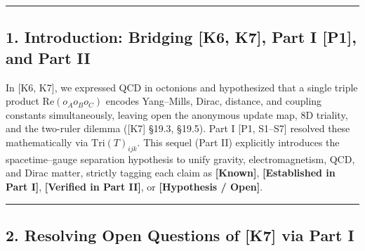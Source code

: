 \documentclass[
  a4paper,
]{article}
\begin{document}
\begin{center}\rule{0.5\linewidth}{0.5pt}\end{center}

\subsection{1. Introduction: Bridging {[}K6, K7{]}, Part I {[}P1{]}, and
Part II}\label{introduction-bridging-k6-k7-part-i-p1-and-part-ii}

In {[}K6, K7{]}, we expressed QCD in octonions and hypothesized that a
single triple product \(\mathrm{Re}(o_A o_B o_C)\) encodes Yang--Mills,
Dirac, distance, and coupling constants simultaneously, leaving open the
anonymous update map, 8D triality, and the two-ruler dilemma ({[}K7{]}
§19.3, §19.5). Part I {[}P1, S1--S7{]} resolved these mathematically via
\(\mathrm{Tri}(T)_{ijk}\). This sequel (Part II) explicitly introduces
the spacetime--gauge separation hypothesis to unify gravity,
electromagnetism, QCD, and Dirac matter, strictly tagging each claim as
\textbf{{[}Known{]}}, \textbf{{[}Established in Part I{]}},
\textbf{{[}Verified in Part II{]}}, or \textbf{{[}Hypothesis / Open{]}}.

\begin{center}\rule{0.5\linewidth}{0.5pt}\end{center}

\subsection{2. Resolving Open Questions of {[}K7{]} via Part
I}\label{resolving-open-questions-of-k7-via-part-i}
\end{document}
